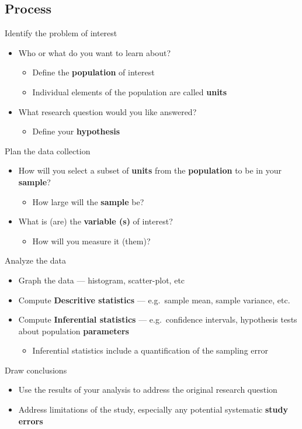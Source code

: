 \documentclass[12pt]{report}
\begin{document}
    \subsection{Process}
      Identify the problem of interest
      \begin{itemize}
        \item Who or what do you want to learn about?
        \begin{itemize}
          \item Define the \textbf{population} of interest
          \item Individual elements of the population are called \textbf{units}
        \end{itemize}
        \item What research question would you like answered?
        \begin{itemize}
          \item Define your \textbf{hypothesis}
        \end{itemize}
      \end{itemize}
      Plan the data collection
      \begin{itemize}
        \item How will you select a subset of \textbf{units} from the
        \textbf{population} to be in your \textbf{sample}?
        \begin{itemize}
          \item How large will the \textbf{sample} be?
        \end{itemize}
        \item What is (are) the \textbf{variable (s)} of interest?
        \begin{itemize}
          \item How will you measure it (them)?
        \end{itemize}
      \end{itemize}
      Analyze the data
      \begin{itemize}
        \item Graph the data --- histogram, scatter-plot, etc
        \item Compute \textbf{Descritive statistics} --- e.g.\ sample mean,
          sample variance, etc.
        \item Compute \textbf{Inferential statistics} --- e.g.\ confidence
        intervals, hypothesis tests about population \textbf{parameters}
          \begin{itemize}
            \item Inferential statistics include a quantification of the
            sampling error
          \end{itemize}
      \end{itemize}
      Draw conclusions
      \begin{itemize}
        \item Use the results of your analysis to address the original research
        question
        \item Address limitations of the study, especially any potential
        systematic \textbf{study errors}
      \end{itemize}
\end{document}
